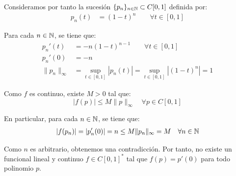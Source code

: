 \begin{ejercicio}
    Consideramos por tanto la sucesión $\{p_n\}_{n \in \mathbb{N}}\subset C[0, 1]$ definida por:
    \begin{align*}
        p_n(t) &= (1 - t)^n\qquad \forall t \in [0, 1]
    \end{align*}

    Para cada $n\in \mathbb{N}$, se tiene que:
    \begin{align*}
        p_n'(t) &= -n(1 - t)^{n - 1}\qquad \forall t \in [0, 1]\\
        p_n'(0) &= -n\\
        \|p_n\|_\infty &= \sup_{t \in [0, 1]} |p_n(t)| = \sup_{t \in [0, 1]} |(1 - t)^n| = 1
    \end{align*}

    Como $f$ es continuo, existe $M > 0$ tal que:
    \begin{equation*}
        |f(p)| \leq M \|p\|_\infty \quad \forall p \in C[0, 1]
    \end{equation*}

    En particular, para cada $n \in \mathbb{N}$, se tiene que:
    \begin{align*}
        |f(p_n)| = |p_n'(0)| = n \leq M \|p_n\|_\infty = M \quad \forall n \in \mathbb{N}
    \end{align*}

    Como $n$ es arbitrario, obtenemos una contradicción. Por tanto, no existe un funcional lineal y continuo $f \in C[0, 1]^*$ tal que $f(p) = p'(0)$ para todo polinomio $p$.
\end{ejercicio}

